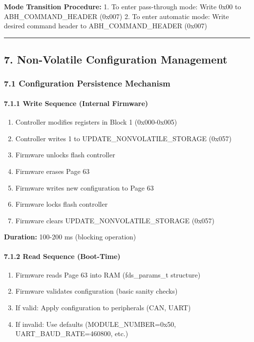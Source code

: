 \documentclass[
  11pt,
]{article}
\providecommand{\tightlist}{%
  \setlength{\itemsep}{0pt}\setlength{\parskip}{0pt}}
\begin{document}
\textbf{Mode Transition Procedure:} 1. To enter pass-through mode: Write
0x00 to ABH\_COMMAND\_HEADER (0x007) 2. To enter automatic mode: Write
desired command header to ABH\_COMMAND\_HEADER (0x007)

\begin{center}\rule{0.5\linewidth}{0.5pt}\end{center}

\subsection{7. Non-Volatile Configuration
Management}\label{non-volatile-configuration-management}

\subsubsection{7.1 Configuration Persistence
Mechanism}\label{configuration-persistence-mechanism}

\paragraph{7.1.1 Write Sequence (Internal
Firmware)}\label{write-sequence-internal-firmware}

\begin{enumerate}
\def\labelenumi{\arabic{enumi}.}
\tightlist
\item
  Controller modifies registers in Block 1 (0x000-0x005)
\item
  Controller writes 1 to UPDATE\_NONVOLATILE\_STORAGE (0x057)
\item
  Firmware unlocks flash controller
\item
  Firmware erases Page 63
\item
  Firmware writes new configuration to Page 63
\item
  Firmware locks flash controller
\item
  Firmware clears UPDATE\_NONVOLATILE\_STORAGE (0x057)
\end{enumerate}

\textbf{Duration:} 100-200 ms (blocking operation)

\paragraph{7.1.2 Read Sequence
(Boot-Time)}\label{read-sequence-boot-time}

\begin{enumerate}
\def\labelenumi{\arabic{enumi}.}
\tightlist
\item
  Firmware reads Page 63 into RAM (fds\_params\_t structure)
\item
  Firmware validates configuration (basic sanity checks)
\item
  If valid: Apply configuration to peripherals (CAN, UART)
\item
  If invalid: Use defaults (MODULE\_NUMBER=0x50,
  UART\_BAUD\_RATE=460800, etc.)
\end{enumerate}
\end{document}
